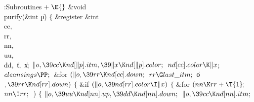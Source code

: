 \Y\B\4:Subroutines\X${}\mathrel+\E{}$\6
\1\1\&{void} \\{purify}(\&{int} \|p)\2\2\6
${}\{{}$\1\6
\&{register} \&{int} \\{cc}${},{}$ \\{rr}${},{}$ \\{nn}${},{}$ \\{uu}${},{}$ %
\\{dd}${},{}$ \|t${},{}$ \|x;\7
${}\|o,\39\\{cc}\K\\{nd}[\|p].\\{itm},\39\|x\K\\{nd}[\|p].\\{color};{}$\6
${}\\{nd}[\\{cc}].\\{color}\K\|x{}$;\6
${}\\{cleansings}\PP;{}$\6
\&{for} ${}(\|o,\39\\{rr}\K\\{nd}[\\{cc}].\\{down};{}$ ${}\\{rr}\G\\{last%
\_itm};{}$ \|o${},\39\\{rr}\K\\{nd}[\\{rr}].\\{down}){}$\5
${}\{{}$\1\6
\&{if} ${}(\|o,\39\\{nd}[\\{rr}].\\{color}\I\|x){}$\5
${}\{{}$\1\6
\&{for} ${}(\\{nn}\K\\{rr}+\T{1};{}$ ${}\\{nn}\I\\{rr};{}$ \,)\5
${}\{{}$\1\6
${}\|o,\39\\{uu}\K\\{nd}[\\{nn}].\\{up},\39\\{dd}\K\\{nd}[\\{nn}].\\{down};{}$\6
${}\|o,\39\\{cc}\K\\{nd}[\\{nn}].\\{itm};{}$\6
